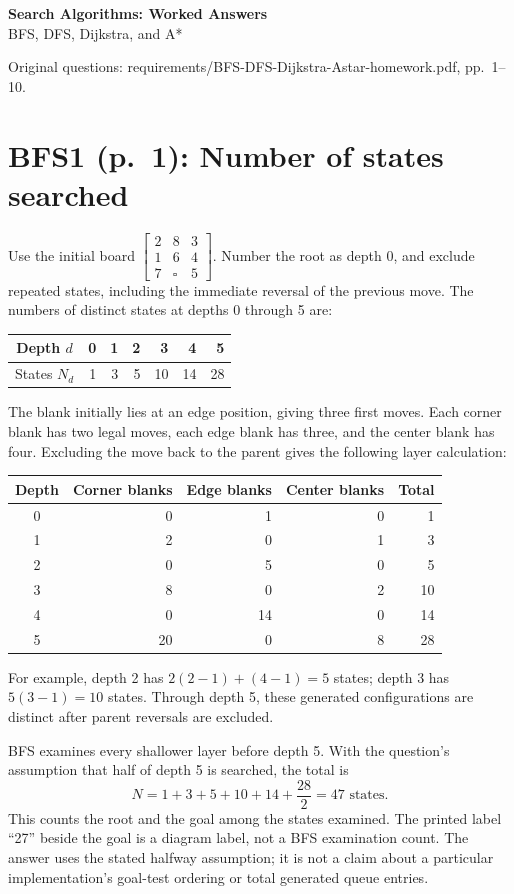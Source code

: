 \documentclass[11pt,a4paper]{article}
\newcommand{\question}[2]{\section*{#1: #2}}
\begin{document}
\begin{center}{\Large\bfseries Search Algorithms: Worked Answers}\\[4pt]BFS, DFS, Dijkstra, and A*\end{center}
\small Original questions: requirements/BFS-DFS-Dijkstra-Astar-homework.pdf, pp.\ 1--10.\normalsize

\question{BFS1 (p.\ 1)}{Number of states searched}
Use the initial board $\left[\begin{smallmatrix}2&8&3\\1&6&4\\7&\square&5\end{smallmatrix}\right]$. Number the root as depth 0, and exclude repeated states, including the immediate reversal of the previous move. The numbers of distinct states at depths 0 through 5 are:
\begin{center}\begin{tabular}{c|rrrrrr}\toprule
Depth $d$&0&1&2&3&4&5\\\midrule
States $N_d$&1&3&5&10&14&28\\\bottomrule
\end{tabular}\end{center}
The blank initially lies at an edge position, giving three first moves. Each corner blank has two legal moves, each edge blank has three, and the center blank has four. Excluding the move back to the parent gives the following layer calculation:
\begin{center}\begin{tabular}{c|rrr|r}\toprule
Depth&Corner blanks&Edge blanks&Center blanks&Total\\\midrule
0&0&1&0&1\\1&2&0&1&3\\2&0&5&0&5\\3&8&0&2&10\\4&0&14&0&14\\5&20&0&8&28\\\bottomrule\end{tabular}\end{center}
For example, depth 2 has $2(2-1)+(4-1)=5$ states; depth 3 has $5(3-1)=10$ states. Through depth 5, these generated configurations are distinct after parent reversals are excluded.

BFS examines every shallower layer before depth 5. With the question's assumption that half of depth 5 is searched, the total is
\[
N=1+3+5+10+14+\frac{28}{2}=\boxed{47\text{ states}}.
\]
This counts the root and the goal among the states examined. The printed label ``27'' beside the goal is a diagram label, not a BFS examination count. The answer uses the stated halfway assumption; it is not a claim about a particular implementation's goal-test ordering or total generated queue entries.
\end{document}
